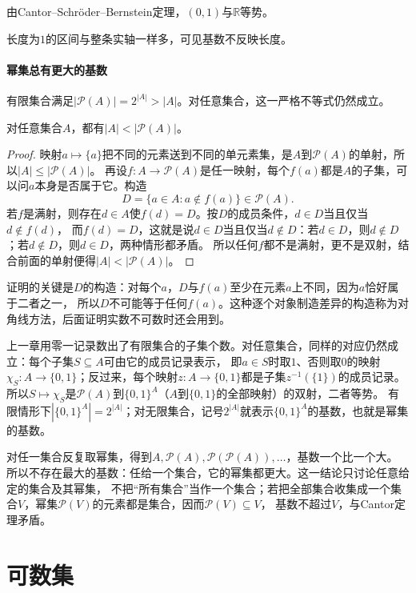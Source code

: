 由Cantor--Schröder--Bernstein定理，$(0,1)$与$\mathbb R$等势。

长度为$1$的区间与整条实轴一样多，可见基数不反映长度。

\paragraph{幂集总有更大的基数}
有限集合满足$|\mathcal P(A)|=2^{|A|}>|A|$。对任意集合，这一严格不等式仍然成立。
\begin{theorem}[Cantor定理]
\label{thm:comb-cantor-power-set}
对任意集合$A$，都有$|A|<|\mathcal P(A)|$。
\end{theorem}
\begin{proof}
映射$a\mapsto\{a\}$把不同的元素送到不同的单元素集，是$A$到$\mathcal P(A)$的单射，所以$|A|\leq|\mathcal P(A)|$。
再设$f:A\to\mathcal P(A)$是任一映射，每个$f(a)$都是$A$的子集，可以问$a$本身是否属于它。构造
\[
 D=\{a\in A:a\notin f(a)\}\in\mathcal P(A).
\]
若$f$是满射，则存在$d\in A$使$f(d)=D$。按$D$的成员条件，$d\in D$当且仅当$d\notin f(d)$，
而$f(d)=D$，这就是说$d\in D$当且仅当$d\notin D$：若$d\in D$，则$d\notin D$；若$d\notin D$，则$d\in D$，两种情形都矛盾。
所以任何$f$都不是满射，更不是双射，结合前面的单射便得$|A|<|\mathcal P(A)|$。
\end{proof}
证明的关键是$D$的构造：对每个$a$，$D$与$f(a)$至少在元素$a$上不同，因为$a$恰好属于二者之一，
所以$D$不可能等于任何$f(a)$。这种逐个对象制造差异的构造称为对角线方法，后面证明实数不可数时还会用到。

上一章用零一记录数出了有限集合的子集个数。对任意集合，同样的对应仍然成立：每个子集$S\subseteq A$可由它的成员记录表示，
即$a\in S$时取$1$、否则取$0$的映射$\chi_S:A\to\{0,1\}$；反过来，每个映射$z:A\to\{0,1\}$都是子集$z^{-1}(\{1\})$的成员记录。
所以$S\mapsto\chi_S$是$\mathcal P(A)$到$\{0,1\}^A$（$A$到$\{0,1\}$的全部映射）的双射，二者等势。
有限情形下$|\{0,1\}^A|=2^{|A|}$；对无限集合，记号$2^{|A|}$就表示$\{0,1\}^A$的基数，也就是幂集的基数。

对任一集合反复取幂集，得到$A,\mathcal P(A),\mathcal P(\mathcal P(A)),\ldots$，基数一个比一个大。
所以不存在最大的基数：任给一个集合，它的幂集都更大。这一结论只讨论任意给定的集合及其幂集，
不把“所有集合”当作一个集合；若把全部集合收集成一个集合$V$，幂集$\mathcal P(V)$的元素都是集合，因而$\mathcal P(V)\subseteq V$，
基数不超过$V$，与Cantor定理矛盾。

\section{可数集}
\label{sec:comb-countable-sets}

